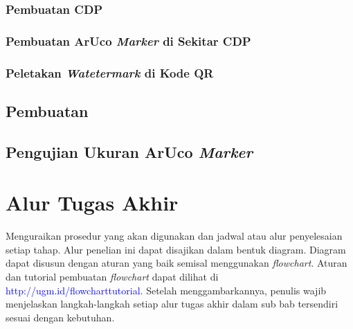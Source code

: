 \subsubsection{Pembuatan CDP}

\subsubsection{Pembuatan ArUco \emph{Marker} di Sekitar CDP}

\subsubsection{Peletakan \emph{Watetermark} di Kode QR}

\subsection{Pembuatan}

\subsection{Pengujian Ukuran ArUco \emph{Marker}}

\section{Alur Tugas Akhir}

Menguraikan prosedur yang akan digunakan dan jadwal atau alur penyelesaian setiap tahap. Alur penelian ini dapat disajikan dalam bentuk diagram. Diagram dapat
disusun dengan aturan yang baik semisal menggunakan \textit{flowchart}. Aturan dan tutorial pembuatan \textit{flowchart} dapat dilihat di
\textcolor{blue}{http://ugm.id/flowcharttutorial}. Setelah menggambarkannya, penulis wajib menjelaskan langkah-langkah setiap alur tugas akhir dalam sub bab
tersendiri sesuai dengan kebutuhan.